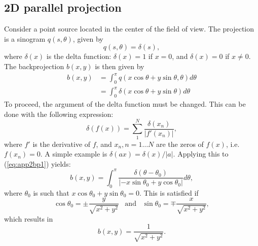 \documentclass[11pt,oneside]{book}
\begin{document}
\subsection{2D parallel projection}
Consider a point source located in the center of the field of view.
The projection is a sinogram $q(s, \theta)$, given by
\begin{equation}
  q(s, \theta) = \delta(s),
\end{equation}
where $\delta(x)$ is the delta function: $\delta(x) = 1$ if $x = 0$, and
$\delta(x) = 0$ if $x \neq 0$.
The backprojection $b(x,y)$ is then given by
\begin{align}
  b(x,y) &= \int_0^\pi q(x \cos\theta + y\sin\theta, \theta)
                d\theta \nonumber\\
         &= \int_0^\pi \delta(x\cos\theta + y\sin\theta) d\theta
                \label{eq:app2bp1}
\end{align}
To proceed, the argument of the delta function must be changed. This
can be done with the following expression:
\begin{equation}
  \delta(f(x)) = \sum_1^N \frac{\delta(x_n)}{|f'(x_n)|},
\end{equation}
where $f'$ is the derivative of $f$, and $x_n, n=1 \ldots N$ are the
zeros of $f(x)$, i.e. $f(x_n) = 0$. A simple example is $\delta(ax) =
\delta(x) / |a|$. Applying this to (\ref{eq:app2bp1}) yields:
\begin{equation}
 b(x,y)  =  \int_0^\pi \frac{\delta(\theta - \theta_0)}
                              {|-x\sin\theta_0 + y\cos\theta_0|} d\theta,
\end{equation}
where $\theta_0$ is such that $x\cos\theta_0 + y\sin\theta_0 =
0$. This is satisfied if
\begin{displaymath}
  \cos\theta_0 = \pm \frac{y}{\sqrt{x^2+y^2}} 
       \;\;\;\mbox{and}\;\;\;
  \sin\theta_0 = \mp \frac{x}{\sqrt{x^2+y^2}},
\end{displaymath}
which results in
\begin{equation}
  b(x,y) = \frac{1}{\sqrt{x^2 + y^2}}.
\end{equation}
\end{document}
